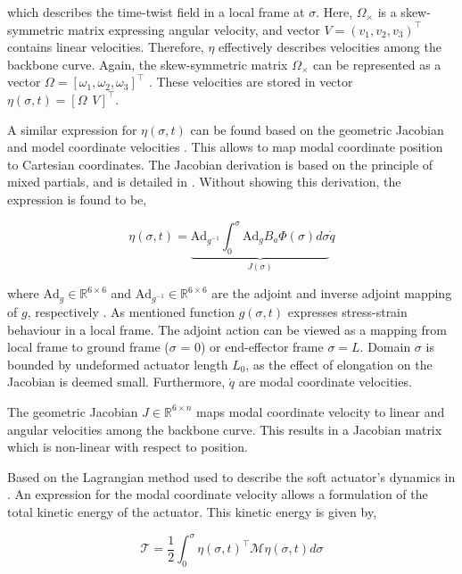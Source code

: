 which describes the time-twist field in a local frame at $\sigma$. Here, $\Omega_\times$ is a skew-symmetric matrix expressing angular velocity, and vector $V = (v_1,v_2,v_3)^\top $ contains linear velocities. Therefore, $\eta$ effectively describes velocities among the backbone curve. Again, the skew-symmetric matrix $\Omega_\times$ can be represented as a vector $\Omega = [\omega_1,\omega_2,\omega_3]^\top$ \cite{Sola2018}. These velocities are stored in vector $\eta(\sigma,t) = [\Omega \hspace{5pt} V]^\top$.


A similar expression for $\eta(\sigma,t)$ can be found based on the geometric Jacobian and model coordinate velocities \cite{Boyer2019} \cite{Caasenbrood2020}. This allows to map modal coordinate position to Cartesian coordinates. The Jacobian derivation is based on the principle of mixed partials, and is detailed in \cite{Caasenbrood2020}. Without showing this derivation, the expression is found to be,

\begin{equation}
    \eta(\sigma,t) = \underbrace{\text{Ad}_{g^{-1}} \int_0^{\sigma} \text{Ad}_{g} B_a \Phi(\sigma) d \sigma}_{J(\sigma)} \dot{q}
    \label{eq2:J}
\end{equation}

where $\text{Ad}_g \in \mathbb{R}^{6 \times 6}$ and $\text{Ad}_{g^{-1}}  \in \mathbb{R}^{6 \times 6}$ are the adjoint and inverse adjoint mapping of $g$, respectively \cite{Sola2018}. As mentioned function $g(\sigma,t)$ expresses stress-strain behaviour in a local frame. The adjoint action can be viewed as a mapping from local frame to ground frame ($\sigma$ = 0) or end-effector frame $\sigma = L$. Domain $\sigma$ is bounded by undeformed actuator length $L_0$, as the effect of elongation on the Jacobian is deemed small. Furthermore, $\Dot{q}$ are modal coordinate velocities. 

The geometric Jacobian $J \in \mathbb{R}^{6\times n}$ maps modal coordinate velocity to linear and angular velocities among the backbone curve. This results in a Jacobian matrix which is non-linear with respect to position. 

Based on the Lagrangian method used to describe the soft actuator's  dynamics in \cite{Caasenbrood2020}. An expression for the modal coordinate velocity allows a formulation of the total kinetic energy of the actuator. This kinetic energy is given by, 

\begin{equation}
    \mathcal{T} = \frac{1}{2}\int_0^{\sigma} \eta(\sigma,t)^\top \mathcal{M} \eta(\sigma,t) d \sigma 
    \label{eq2:T}
\end{equation}


